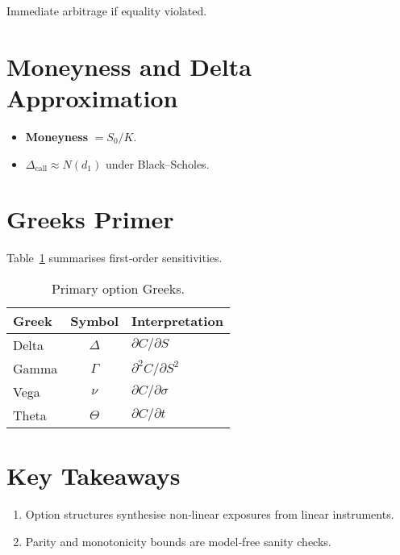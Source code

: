 Immediate arbitrage if equality violated.

\section{Moneyness and Delta Approximation}

\begin{itemize}
  \item \textbf{Moneyness} \(= S_0/K\).
  \item \(\Delta_{\text{call}} \approx N(d_1)\) under Black–Scholes.
\end{itemize}

\section{Greeks Primer}

Table \ref{tab:greeks} summarises first‑order sensitivities.

\begin{table}[h]
  \centering
  \begin{tabular}{@{}lcl@{}}
  \toprule
  Greek & Symbol & Interpretation \\\midrule
  Delta & \(\Delta\) & \(\partial C/\partial S\) \\
  Gamma & \(\Gamma\) & \(\partial^2 C/\partial S^2\) \\
  Vega  & \(\nu\)    & \(\partial C/\partial \sigma\) \\
  Theta & \(\Theta\) & \(\partial C/\partial t\) \\\bottomrule
  \end{tabular}
  \caption{Primary option Greeks.}
  \label{tab:greeks}
\end{table}

\section*{Key Takeaways}
\begin{enumerate}
  \item Option structures synthesise non‑linear exposures from linear instruments.
  \item Parity and monotonicity bounds are model‑free sanity checks.
\end{enumerate}
